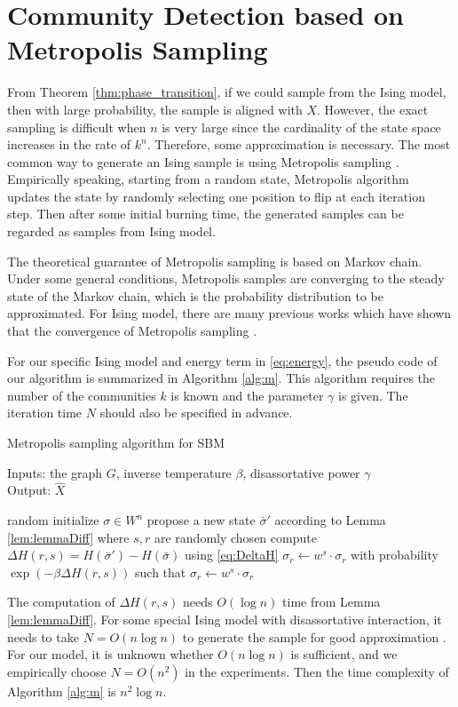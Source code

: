 \documentclass[entropy,article,submit,moreauthors,pdftex]{Definitions/mdpi}
\newcommand{\1}{\mathbbm{1}}
\begin{document}
\section{Community Detection based on Metropolis Sampling}\label{sec:ms}
From Theorem \ref{thm:phase_transition}, if we could sample from the Ising model, then with large probability, the sample
is aligned with $X$. However, the exact sampling is difficult when $n$ is very large since the cardinality of the state space increases in
the rate of $k^n$. Therefore, some approximation is
necessary. The most common way to generate an Ising sample is using Metropolis sampling \cite{metropolis1953equation}. 
Empirically speaking, starting from a random state, Metropolis algorithm updates the state by randomly selecting one position to flip at each iteration step.
Then after some initial burning time, the generated samples can be regarded as samples from Ising model.

The theoretical guarantee of Metropolis sampling is based on Markov chain. Under some general conditions, Metropolis samples are converging to
the steady state of the Markov chain, which is the probability distribution to be approximated. For Ising model, there are many previous works which have shown that the convergence of Metropolis sampling \cite{diaconis1998we}.

For our specific Ising model and energy term in \eqref{eq:energy},
the pseudo code of our algorithm is summarized in Algorithm \ref{alg:m}.
This algorithm requires the number of the communities $k$ is known and the parameter $\gamma$ is given.
The iteration time $N$ should also be specified in advance.
\begin{algorithm}[H]
	\caption{Metropolis sampling algorithm for SBM} \label{alg:m}
	Inputs: the graph $G$, inverse temperature $\beta$, disassortative power $\gamma$ \\
	Output: $\hat{X}$
	\begin{algorithmic}[1]
		\STATE random initialize $\sigma \in W^n$
		\STATE propose a new state $\bar{\sigma}'$ according to Lemma \ref{lem:lemmaDiff} where $s, r$ are randomly chosen
		\STATE compute $\Delta H(r,s) = H(\bar{\sigma}') - H(\bar{\sigma})$ using \eqref{eq:DeltaH}
		\STATE $\sigma_r \leftarrow w^s \cdot \sigma_r$
		\ELSE
		\STATE with probability $\exp(-\beta \Delta H(r,s))$
			such that $\sigma_r \leftarrow w^s \cdot \sigma_r$
		\ENDIF
		\ENDFOR
	\end{algorithmic}
\end{algorithm}
The computation of $\Delta H(r,s)$ needs $O(\log n)$ time from Lemma \ref{lem:lemmaDiff}.
For some special Ising model with disassortative interaction, it needs to take $N=O(n\log n)$ to generate the sample for good approximation \cite{mcmc}. For our model, it is unknown whether $O(n\log n)$ is sufficient, and we empirically choose $N=O(n^2)$ in the experiments.
Then the time complexity of Algorithm \ref{alg:m} is $n^2 \log n$.
\end{document}
